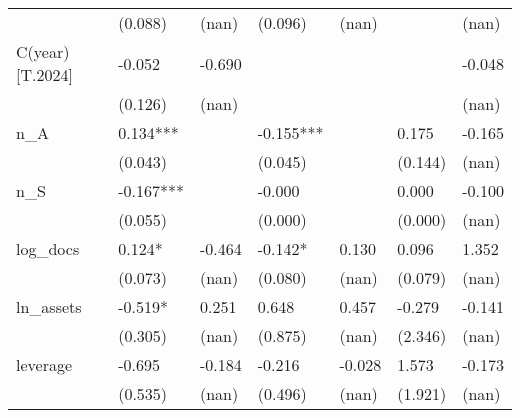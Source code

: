 \begin{table}
\begin{center}
\begin{tabular}{lllllll}
                  & (0.088)            & (nan)              & (0.096)              & (nan)                &                      & (nan)                          \\
C(year)[T.2024]   & -0.052             & -0.690             &                      &                      &                      & -0.048                         \\
                  & (0.126)            & (nan)              &                      &                      &                      & (nan)                          \\
n\_A              & 0.134***           &                    & -0.155***            &                      & 0.175                & -0.165                         \\
                  & (0.043)            &                    & (0.045)              &                      & (0.144)              & (nan)                          \\
n\_S              & -0.167***          &                    & -0.000               &                      & 0.000                & -0.100                         \\
                  & (0.055)            &                    & (0.000)              &                      & (0.000)              & (nan)                          \\
log\_docs         & 0.124*             & -0.464             & -0.142*              & 0.130                & 0.096                & 1.352                          \\
                  & (0.073)            & (nan)              & (0.080)              & (nan)                & (0.079)              & (nan)                          \\
ln\_assets        & -0.519*            & 0.251              & 0.648                & 0.457                & -0.279               & -0.141                         \\
                  & (0.305)            & (nan)              & (0.875)              & (nan)                & (2.346)              & (nan)                          \\
leverage          & -0.695             & -0.184             & -0.216               & -0.028               & 1.573                & -0.173                         \\
                  & (0.535)            & (nan)              & (0.496)              & (nan)                & (1.921)              & (nan)                          \\

\end{tabular}
\end{center}
\end{table}
